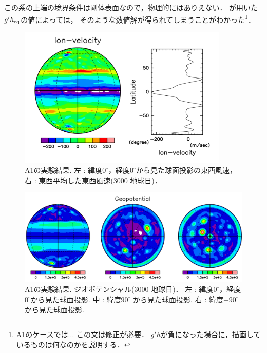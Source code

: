 \documentclass[a4j,12pt,openbib,oneside]{jreport}
\begin{document}
この系の上端の境界条件は剛体表面なので，物理的にはありえない． %
\cite{Showman2007} が用いた$g'h_{\rm{eq}}$の値によっては，
そのような数値解が得られてしまうことがわかった\footnote{A1のケースでは... この文は修正が必要．
$g'h$が負になった場合に，描画しているものは何なのかを説明する． }．
%
\begin{figure}[b]
  \begin{center}
    \includegraphics[clip,width=10cm]{./fig/result/A1/A1_1.png}
    \caption{
      \footnotesize{A1の実験結果. 左 : 緯度$0^\circ$，経度$0^\circ$から見た球面投影の東西風速，右 : 東西平均した東西風速(3000 地球日)．
      }
    }
    \label{fig:A1_1}
  \end{center}
\end{figure}
%
\begin{figure}[ht]
  \begin{center}
    \includegraphics[clip,width=12cm]{./fig/result/A1/A1_2.png}
    \caption{
      \footnotesize{A1の実験結果. ジオポテンシャル(3000 地球日)．
左 : 緯度$0^\circ$，経度$0^\circ$から見た球面投影.
中 : 緯度$90^\circ$ から見た球面投影.
右 : 緯度$-90^\circ$ から見た球面投影.
      }
    }
    \label{fig:A1_2}
  \end{center}
\end{figure}
%
\end{document}

